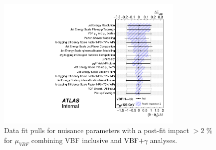 \begin{figure}[htbp]
  \centering
 \includegraphics[width=0.8\textwidth]{figures/VBF/VBFHbb_Combined_vbfonly_pulls_125.pdf}
\caption{Data fit pulls for nuisance parameters with a post-fit impact $> 2$ \% for $\mu_{VBF}$ combining VBF inclusive and VBF$+\gamma$ analyses.}
  \label{fig:vbf-vbffitpull_combination}
\end{figure}
